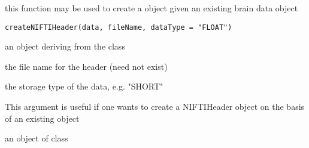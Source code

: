 \begin{Description}\relax
this function may be used to create a  object given
an existing brain data object
\end{Description}
\begin{Usage}
\begin{verbatim}
createNIFTIHeader(data, fileName, dataType = "FLOAT")
\end{verbatim}
\end{Usage}
\begin{Arguments}
\begin{ldescription}
\item[\code{data}] an object deriving from the class  
\item[\code{fileName}] the file name for the header (need not exist) 
\item[\code{dataType}] the storage type of the data, e.g. "SHORT" 
\end{ldescription}
\end{Arguments}
\begin{Details}\relax
This argument is useful if one wants to create a NIFTIHeader object
on the basis of an existing  object
\end{Details}
\begin{Value}
an object of class 
\end{Value}

